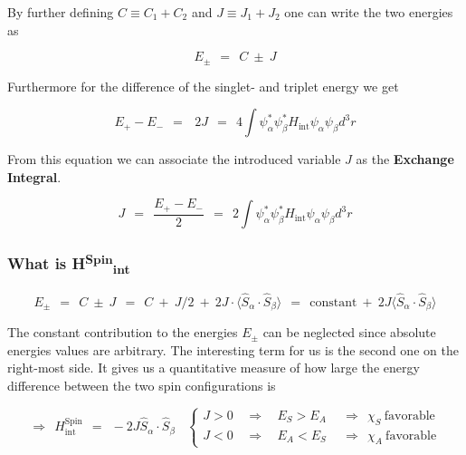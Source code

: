 \documentclass[10pt]{report}
\numberwithin{equation}{chapter}
\begin{document}
By further defining $C \equiv C_1+C_2$ and $J \equiv J_1+J_2$ one can write the two energies as

\begin{equation}
  E_\pm ~~=~~ C ~\pm~ J
\end{equation}

Furthermore for the difference of the singlet- and triplet energy we get

\begin{equation}
  E_+ - E_- ~~=~~~2J ~~=~~ 4 \int \psi^*_\alpha \psi^*_\beta H_\text{int} \psi_\alpha \psi_\beta d^3r
\end{equation}

From this equation we can associate the introduced variable $J$ as the \textbf{Exchange Integral}.

\begin{equation}
  J ~~=~~ \frac{E_+-E_-}{2} ~~=~~ 2 \int \psi^*_\alpha \psi^*_\beta H_\text{int} \psi_\alpha \psi_\beta d^3r
\end{equation}


\subsubsection{What is H\textsuperscript{Spin}\textsubscript{int}}

\begin{equation}
  E_\pm ~~=~~ C ~\pm~ J 
  ~~=~~ C ~+~ J/2 ~+~ 2J \cdot \langle \hat{S}_\alpha \cdot \hat{S}_\beta \rangle 
  ~~=~~ \text{constant} ~+~ 2J \langle \hat{S}_\alpha \cdot \hat{S}_\beta \rangle
\end{equation}

The constant contribution to the energies $E_\pm$ can be neglected since absolute energies values are arbitrary. The interesting term for us is the second one on the right-most side. It gives us a quantitative measure of how large the energy difference between the two spin configurations is

\begin{equation}
  \Rightarrow ~~ H^\text{Spin}_\text{int} ~~=~~ - 2J \hat{S}_\alpha \cdot \hat{S}_\beta ~~~~ \left\{
  \begin{array}{lccr}
    J > 0 & ~~ \Rightarrow ~~ & E_S > E_A & ~~\Rightarrow~~ \chi_S\ \text{favorable}\\
    J < 0 & ~~ \Rightarrow ~~ & E_A < E_S & ~~\Rightarrow~~ \chi_A\ \text{favorable}
  \end{array}\right.
\end{equation}
\end{document}
